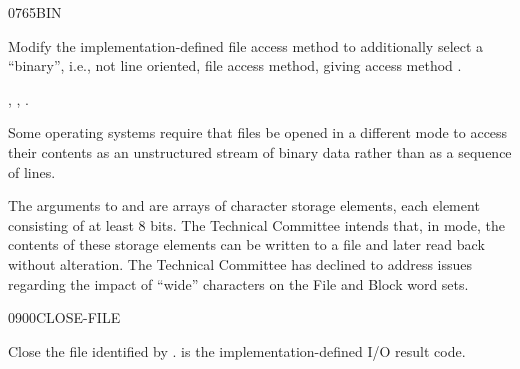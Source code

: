 \begin{worddef}{0765}{BIN}
\item {}

	Modify the implementation-defined file access method
	 to additionally select a ``binary'', i.e., not
	line oriented, file access method, giving access method
	.

\see {},
	,
	.

	\begin{rationale} %
		Some operating systems require that files be opened in a
		different mode to access their contents as an unstructured
		stream of binary data rather than as a sequence of lines.

		The arguments to  and  are
		arrays of character storage elements, each element consisting
		of at least 8 bits. The Technical Committee intends that, in
		 mode, the contents of these storage elements can be
		written to a file and later read back without alteration. The
		Technical Committee has declined to address issues regarding
		the impact of ``wide'' characters on the File and Block word
		sets.
	\end{rationale}
\end{worddef}


\begin{worddef}{0900}{CLOSE-FILE}
\item {}

	Close the file identified by .  is the
	implementation-defined I/O result code.
\end{worddef}


